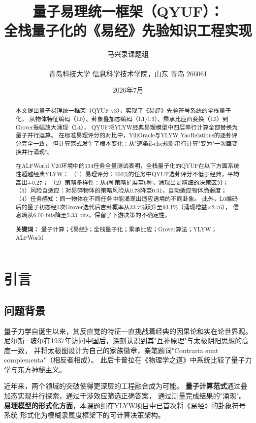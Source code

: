 \documentclass[twocolumn]{article}
\title{\textbf{量子易理统一框架（QYUF）：\\全栈量子化的《易经》先验知识工程实现}}
\author{马兴录课题组\\\\
青岛科技大学 信息科学技术学院，山东 青岛 266061}
\date{2026年7月}
\begin{document}
\maketitle

\begin{abstract}
本文提出量子易理统一框架（QYUF v3），实现了《易经》先验符号系统的全栈量子化。
从物体特征编码（L0）、卦象叠加态编码（L1/L2）、乘承比应酉变换（L3）到Grover振幅放大涌现（L4），
QYUF将YLYW经典易理模型中四层串行计算全部替换为量子并行运算。
在标准易理评分的对比中，YiliOracle与YLYW YaoRelations的逐卦评分完全一致，
但计算范式发生了根本变化：从"逐条if-else规则串行计算"变为"一次酉变换并行涌现"。

在ALFWorld V20环境中的134任务全量测试表明，全栈量子化的QYUF在以下方面系统性超越经典YLYW：
（1）易理评分：100\%的任务中QYUF选卦评分不低于经典，平均高出+0.27；
（2）策略多样性：从4种策略扩展至6种，涌现出更精细的决策区分；
（3）风险自适应：对易碎物体的策略风险从0.78降至0.31，自动适应物体脆弱度；
（4）任务感知：同一物体在不同任务中能涌现出适应语境的不同卦象。
此外，L0编码后的量子初态经1次Grover迭代后吉卦概率从33.7\%跃升至93.1\%（涌现增益×2.76），
信息熵从6.00 bits降至5.33 bits，保留了下游决策的不确定性。

\textbf{关键词：} 量子计算；《易经》；全栈量子化；乘承比应；Grover算法；YLYW；ALFWorld
\end{abstract}

\section{引言}

\subsection{问题背景}

量子力学自诞生以来，其反直觉的特征一直挑战着经典的因果论和实在论世界观。
尼尔斯·玻尔在1937年访问中国后，深刻认识到其"互补原理"与太极阴阳思想的高度一致，
并将太极图设计为自己的家族徽章，亲笔题词"Contraria sunt complementa"（相反者相成）\cite{bohr1949}。
此后卡普拉在《物理学之道》中系统比较了量子力学与东方神秘主义\cite{capra1975}。

近年来，两个领域的突破使得更深层的工程融合成为可能。
\textbf{量子计算范式}通过叠加态实现并行探索，通过干涉效应筛选正确答案，
通过测量完成结果的"涌现"\cite{nielsen2010}。
\textbf{易理模型的形式化方面}，本课题组在YLYW项目中已首次将《易经》的卦象符号系统
形式化为模糊隶属度框架下的可计算决策架构\cite{ylyw2026}。
\end{document}
